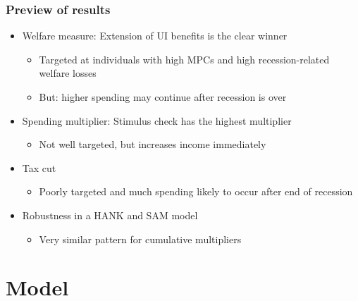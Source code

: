 \documentclass[pdflatex,aspectratio=169]{beamer}
\begin{document}
\begin{frame}
  \frametitle{Preview of results}
  \begin{itemize}[<+->]
    \itemsep = \bigskipamount
    \item
          Welfare measure: Extension of UI benefits is the clear winner
          \begin{itemize}[<+->]
            \itemsep = .25\bigskipamount
            \item
                  Targeted at individuals with high MPCs and high recession-related welfare losses
            \item
                  But: higher spending may continue after recession is over
          \end{itemize}
    \item
          Spending multiplier: Stimulus check has the highest multiplier
          \begin{itemize}[<+->]
            \itemsep = .25\bigskipamount
            \item
                  Not well targeted, but increases income immediately
          \end{itemize}
    \item
          Tax cut
          \begin{itemize}[<+->]
            \itemsep = .25\bigskipamount
            \item
                  Poorly targeted and much spending likely to occur after end of recession
          \end{itemize}
    \item
          Robustness in a HANK and SAM model
          \begin{itemize}[<+->]
            \itemsep = .25\bigskipamount
            \item
                  Very similar pattern for cumulative multipliers
          \end{itemize}
  \end{itemize}
\end{frame}

\section{Model}
\end{document}
